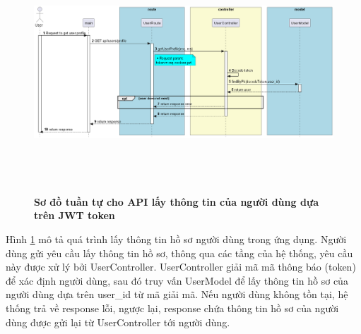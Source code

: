 \begin{enumerate}[a)]
\begin{figure}[H]
  \centering
  \includegraphics[width=16cm,height=9cm]{Images/server/sequence/server/getUserProfile.png}
  \caption[Sơ đồ tuần tự cho API lấy thông tin của người dùng dựa trên JWT token ]{\bfseries \fontsize{12pt}{0pt}
  \selectfont Sơ đồ tuần tự cho API lấy thông tin của người dùng dựa trên JWT token }
  \label{getUserProfile} %
\end{figure}
Hình \ref{getUserProfile} mô tả quá trình lấy thông tin hồ sơ người dùng trong ứng dụng. Người dùng gửi yêu cầu lấy thông tin hồ sơ, thông qua các tầng của hệ thống, yêu cầu này được xử lý bởi UserController. UserController giải mã mã thông báo (token) để xác định người dùng, sau đó truy vấn UserModel để lấy thông tin hồ sơ của người dùng dựa trên user\_id từ mã giải mã. Nếu người dùng không tồn tại, hệ thống trả về response lỗi, ngược lại, response chứa thông tin hồ sơ của người dùng được gửi lại từ UserController tới người dùng.







\end{enumerate}
